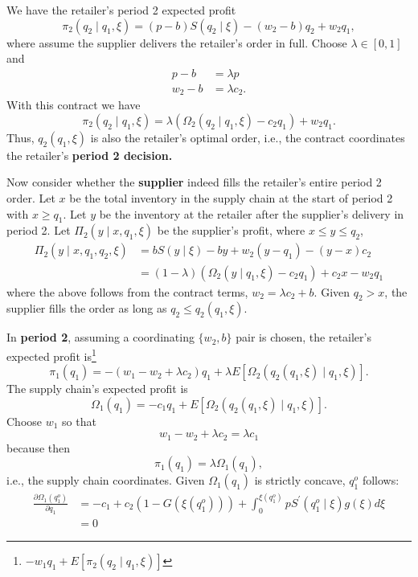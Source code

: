 We have the retailer's period 2 expected profit
\begin{equation*}
    \pi_2(q_2\mid q_1,\xi)=(p-b)S(q_2\mid \xi)-(w_2-b)q_2+w_2 q_1,
\end{equation*}
where assume the supplier delivers the retailer's order in full. Choose $\lambda\in[0,1]$ and 
\begin{align*}
    p-b&=\lambda p\\
    w_2-b&=\lambda c_2.
\end{align*}
With this contract we have 
\begin{equation*}
    \pi_2(q_2\mid q_1,\xi)=\lambda(\Omega_2(q_2\mid q_1,\xi)-c_2 q_1)+w_2 q_1.
\end{equation*}
Thus, $q_2(q_1,\xi)$ is also the retailer's optimal order, i.e., the contract coordinates the retailer's \textbf{period 2 decision.}

Now consider whether the \textbf{supplier} indeed fills the retailer's entire period 2 order. Let $x$ be the total inventory in the supply chain at the start of period 2 with $x\geq q_1$. Let $y$ be the inventory at the retailer after the supplier's delivery in period 2. Let $\Pi_2(y\mid x, q_1,\xi)$ be the supplier's profit, where $x\leq y\leq q_2$,
\begin{align*}
    \Pi_2(y\mid x,q_1,q_2,\xi)&=b S(y\mid\xi)-by+w_2(y-q_1)-(y-x)c_2\\
    &=(1-\lambda)(\Omega_2(y\mid q_1,\xi)-c_2 q_1)+c_2 x- w_2 q_1
\end{align*}
where the above follows from the contract terms, $w_2=\lambda c_2+b$. Given $q_2>x$, the supplier fills the order as long as $q_2\leq q_2(q_1,\xi)$. 

In \textbf{period 2}, assuming a coordinating $\{w_2,b\}$ pair is chosen, the retailer's expected profit is\footnote{$-w_1 q_1+E\left[\pi_2(q_2\mid q_1,\xi)\right]$} 
\begin{equation*}
    \pi_1(q_1)=-(w_1-w_2+\lambda c_2)q_1+\lambda E\left[\Omega_2(q_2(q_1,\xi)\mid q_1,\xi)\right].
\end{equation*}
The supply chain's expected profit is 
\begin{equation*}
    \Omega_1(q_1)=-c_1 q_1+E\left[\Omega_2(q_2(q_1,\xi)\mid q_1,\xi)\right].
\end{equation*}
Choose $w_1$ so that 
\begin{equation*}
    w_1-w_2+\lambda c_2=\lambda c_1
\end{equation*}
because then
\begin{equation*}
    \pi_1(q_1)=\lambda \Omega_1(q_1),
\end{equation*}
i.e., the supply chain coordinates.
Given $\Omega_1(q_1)$ is strictly concave, $q_1^o$ follows:
\begin{align}
     \frac{\partial\Omega_1(q_1^o)}{\partial q_1}&=-c_1+c_2(1-G(\xi(q_1^o)))+\int_0^{\xi(q_1^o)} p S^\prime(q_1^o\mid\xi) g(\xi)d \xi \nonumber\\
    &=0 \label{eq:6.4}
\end{align}


